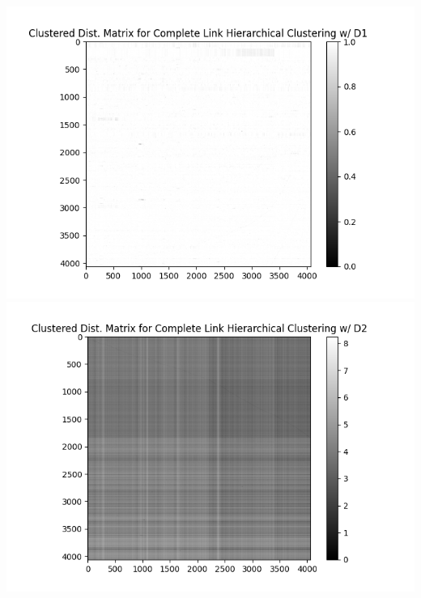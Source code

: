 \documentclass[fleqn]{article}
\begin{document}
\includegraphics[scale=0.8]{images/dist_matrix_hc_d1.png}\\
\includegraphics[scale=0.8]{images/dist_matrix_hc_d2.png}\\
\end{document}
